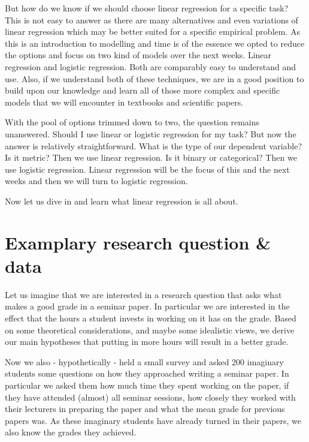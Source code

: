 \documentclass[
]{book}
\begin{document}
But how do we know if we should choose linear regression for a specific task?
This is not easy to answer as there are many alternatives and even variations of
linear regression which may be better suited for a specific empirical problem.
As this is an introduction to modelling and time is of the essence we opted to
reduce the options and focus on two kind of models over the next weeks. Linear
regression and logistic regression. Both are comparably easy to understand and
use. Also, if we understand both of these techniques, we are in a good position
to build upon our knowledge and learn all of those more complex and specific
models that we will encounter in textbooks and scientific papers.

With the pool of options trimmed down to two, the question remains unanswered.
Should I use linear or logistic regression for my task? But now the answer is
relatively straightforward. What is the type of our dependent variable? Is it
metric? Then we use linear regression. Is it binary or categorical? Then we use
logistic regression. Linear regression will be the focus of this and the next
weeks and then we will turn to logistic regression.

Now let us dive in and learn what linear regression is all about.

\hypertarget{examplary-research-question-data}{%
\section{Examplary research question \& data}\label{examplary-research-question-data}}

Let us imagine that we are interested in a research question that asks what
makes a good grade in a seminar paper. In particular we are interested in the
effect that the hours a student invests in working on it has on the grade. Based
on some theoretical considerations, and maybe some idealistic views, we derive
our main hypotheses that putting in more hours will result in a better grade.

Now we also - hypothetically - held a small survey and asked 200 imaginary
students some questions on how they approached writing a seminar paper. In
particular we asked them how much time they spent working on the paper, if they
have attended (almost) all seminar sessions, how closely they worked with their
lecturers in preparing the paper and what the mean grade for previous papers
was. As these imaginary students have already turned in their papers, we also
know the grades they achieved.
\end{document}
